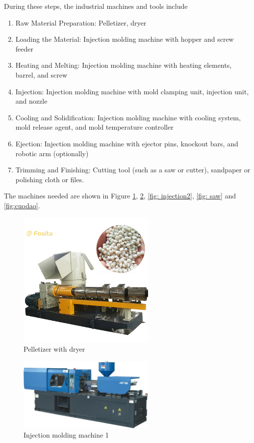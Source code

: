 During these steps, the industrial machines and tools include 
\begin{enumerate}
    \item Raw Material Preparation: Pelletizer, dryer
    \item Loading the Material: Injection molding machine with hopper and screw feeder
    \item Heating and Melting: Injection molding machine with heating elements, barrel, and screw
    \item Injection: Injection molding machine with mold clamping unit, injection unit, and nozzle
    \item Cooling and Solidification: Injection molding machine with cooling system, mold release agent, and mold temperature controller
    \item Ejection: Injection molding machine with ejector pins, knockout bars, and robotic arm (optionally)
    \item Trimming and Finishing: Cutting tool (such as a saw or cutter), sandpaper or polishing cloth or files.
\end{enumerate}
The machines needed are shown in Figure \ref{fig: pelletizer}, \ref{fig: injection}, \ref{fig: injection2}, \ref{fig: saw} and \ref{fig:cuodao}.

\begin{figure}[!htp]
    \centering
    \includegraphics[width=0.6\textwidth]{images/Pelletizer.jpg}
    \caption{Pelletizer with dryer}
    \label{fig: pelletizer}
\end{figure}

\begin{figure}[!htp]
    \centering
    \includegraphics[width=0.6\textwidth]{images/Injection.jpg}
    \caption{Injection molding machine 1}
    \label{fig: injection}
\end{figure}

